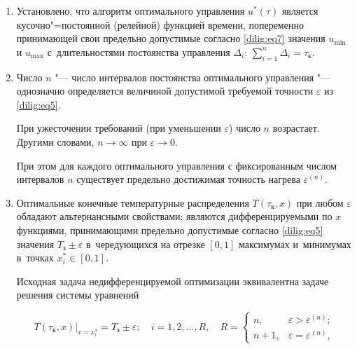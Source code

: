 \begin{enumerate}

\item[1.] Установлено, что алгоритм оптимального управления $u^\ast (\tau )$ является кусочно"=постоянной (релейной) функцией времени, попеременно принимающей свои предельно допустимые согласно \eqref{dilig:eq7} значения $u_{\min}$ и $u_{\max}$ с~длительностями постоянства управления $\Delta _i$: $\sum_{i=1}^n {\Delta _i } =\tau_{\text{к}} $.



\item[\textcolor{white}{\eqref{dilig:eq2}}\!\!.] Число $n$ "--- число интервалов постоянства оптимального управления "--- однозначно определяется величиной допустимой требуемой точности $\varepsilon$  из \eqref{dilig:eq5}.

При ужесточении требований (при уменьшении $\varepsilon $) число $n$ возрастает. Другими словами, $n\to \infty $ при $\varepsilon \to 0$. 

При этом для каждого оптимального управления с фиксированным числом интервалов $n$ существует предельно достижимая точность нагрева $\varepsilon ^{(n)}$. \phantom{\eqref{dilig:eq2}}



\item[\textcolor{white}{\eqref{dilig:eq3}}\!\!.] Оптимальные конечные температурные распределения $T(\tau_{\text{к}}, x)$ при любом $\varepsilon $ обладают альтернансными свойствами: являются дифференцируемыми по $x$ функциями, принимающими предельно допустимые согласно \eqref{dilig:eq5} значения $T_{\text{з}} \pm \varepsilon $ в~чередующихся на отрезке $[0, 1]$ максимумах и~минимумах в~точках $x_i^\ast \in [0, 1]$.

Исходная задача недифференцируемой оптимизации эквивалентна задаче решения системы уравнений

\begin{equation}

\label{dilig:eq8} 

T(\tau_{\text{к}}, x) \bigr|_{x= x_i^\ast } =T_{\text{з}} \pm \varepsilon; 

\quad i=1, 2, \dots, R, \quad  R=

\begin{cases}

 n, & \varepsilon >\varepsilon ^{(n)}; \\

 n+1,&\varepsilon =\varepsilon ^{(n)},  \end{cases}


\end{equation}
\end{enumerate}
